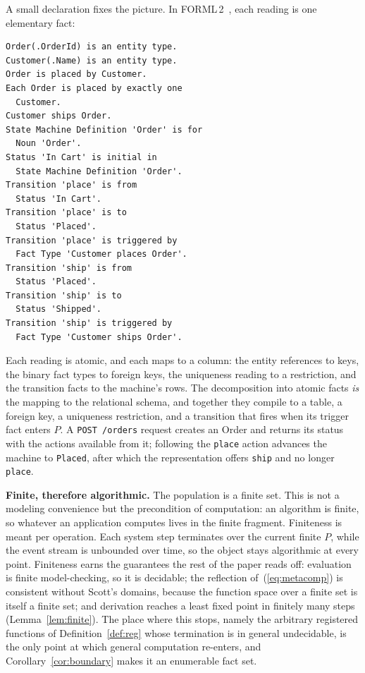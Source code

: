 \documentclass[10pt,twocolumn]{article}
\theoremstyle{plain}
\theoremstyle{definition}
\begin{document}
A small declaration fixes the picture. In FORML\,2~\cite{halpin10}, each reading is one elementary fact:
\begin{lstlisting}
Order(.OrderId) is an entity type.
Customer(.Name) is an entity type.
Order is placed by Customer.
Each Order is placed by exactly one
  Customer.
Customer ships Order.
State Machine Definition 'Order' is for
  Noun 'Order'.
Status 'In Cart' is initial in
  State Machine Definition 'Order'.
Transition 'place' is from
  Status 'In Cart'.
Transition 'place' is to
  Status 'Placed'.
Transition 'place' is triggered by
  Fact Type 'Customer places Order'.
Transition 'ship' is from
  Status 'Placed'.
Transition 'ship' is to
  Status 'Shipped'.
Transition 'ship' is triggered by
  Fact Type 'Customer ships Order'.
\end{lstlisting}
Each reading is atomic, and each maps to a column: the entity references to keys, the binary fact types to foreign keys, the uniqueness reading to a restriction, and the transition facts to the machine's rows. The decomposition into atomic facts \emph{is} the mapping to the relational schema, and together they compile to a table, a foreign key, a uniqueness restriction, and a transition that fires when its trigger fact enters $P$. A \texttt{POST /orders} request creates an Order and returns its status with the actions available from it; following the \texttt{place} action advances the machine to \texttt{Placed}, after which the representation offers \texttt{ship} and no longer \texttt{place}.

\smallskip\noindent\textbf{Finite, therefore algorithmic.} The population is a finite set. This is not a modeling convenience but the precondition of computation: an algorithm is finite, so whatever an application computes lives in the finite fragment. Finiteness is meant per operation. Each system step terminates over the current finite $P$, while the event stream is unbounded over time, so the object stays algorithmic at every point. Finiteness earns the guarantees the rest of the paper reads off: evaluation is finite model-checking, so it is decidable; the reflection of~(\ref{eq:metacomp}) is consistent without Scott's domains, because the function space over a finite set is itself a finite set; and derivation reaches a least fixed point in finitely many steps (Lemma~\ref{lem:finite}). The place where this stops, namely the arbitrary registered functions of Definition~\ref{def:reg} whose termination is in general undecidable, is the only point at which general computation re-enters, and Corollary~\ref{cor:boundary} makes it an enumerable fact set.
\end{document}

